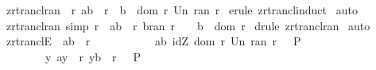 \begin{isabellebody}
\isamarkupfalse%
%
\endisatagproof
{\isafoldproof}%
%
\isadelimproof
\isanewline
%
\endisadelimproof
\isanewline
{}\isamarkupfalse%
\ zrtrancl{\isacharunderscore}ran{}\ {\isacharcolon}\ {\isachardoublequoteopen}{\isacharbang}{\isacharbang}r\ {\isachardot}{\isacharparenleft}a{\isacharcomma}b{\isacharparenright}\ {\isacharcolon}\ {\isacharparenleft}r{\isacharpercent}{\isacharasterisk}{\isacharparenright}\ {\isacharequal}{\isacharequal}{\isachargreater}\ b\ {\isacharcolon}\ dom\ r\ Un\ ran\ r{\isachardoublequoteclose}\isanewline
%
\isadelimproof
%
\endisadelimproof
%
\isatagproof
{}\isamarkupfalse%
\ {\isacharparenleft}erule\ zrtrancl{\isacharunderscore}induct{\isacharparenright}\isanewline
{}\isamarkupfalse%
\ auto\isanewline
{}\isamarkupfalse%
%
\endisatagproof
{\isafoldproof}%
%
\isadelimproof
\isanewline
%
\endisadelimproof
\isanewline
{}\isamarkupfalse%
\ zrtrancl{\isacharunderscore}ran{}\ {\isacharbrackleft}simp{\isacharbrackright}{\isacharcolon}\ {\isachardoublequoteopen}{\isacharbang}{\isacharbang}r\ {\isachardot}{\isacharbrackleft}{\isacharbar}\ {\isacharparenleft}a{\isacharcomma}b{\isacharparenright}\ {\isacharcolon}\ {\isacharparenleft}r{\isacharpercent}{\isacharasterisk}{\isacharparenright}{\isacharsemicolon}\ b{\isachartilde}{\isacharcolon}ran\ r\ {\isacharbar}{\isacharbrackright}\ \ {\isacharequal}{\isacharequal}{\isachargreater}\ b\ {\isacharcolon}\ dom\ r{\isachardoublequoteclose}\isanewline
%
\isadelimproof
%
\endisadelimproof
%
\isatagproof
{}\isamarkupfalse%
\ {\isacharparenleft}drule\ zrtrancl{\isacharunderscore}ran{}{\isacharparenright}\isanewline
{}\isamarkupfalse%
\ auto\isanewline
{}\isamarkupfalse%
%
\endisatagproof
{\isafoldproof}%
%
\isadelimproof
\isanewline
%
\endisadelimproof
\isanewline
\isanewline
\isanewline
{}\isamarkupfalse%
\ zrtranclE{}{\isacharcolon}\ {\isachardoublequoteopen}{\isacharbrackleft}{\isacharbar}\ {\isacharparenleft}a{\isacharcomma}b{\isacharparenright}\ {\isacharcolon}\ r{\isacharpercent}{\isacharasterisk}{\isacharsemicolon}\ \ \isanewline
\ \ \ \ \ \ \ \ {\isacharbrackleft}{\isacharbar}\ {\isacharparenleft}a{\isacharcomma}b{\isacharparenright}{\isacharcolon}\ {\isacharparenleft}idZ\ {\isacharparenleft}dom\ r\ Un\ ran\ r{\isacharparenright}{\isacharparenright}{\isacharbar}{\isacharbrackright}\ \ {\isacharequal}{\isacharequal}{\isachargreater}\ P{\isacharsemicolon}\ \ \ \ \ \ \ \ \ \isanewline
\ \ \ \ \ \ \ \ {\isacharbang}{\isacharbang}y{\isachardot}{\isacharbrackleft}{\isacharbar}\ {\isacharparenleft}a{\isacharcomma}y{\isacharparenright}\ {\isacharcolon}\ r{\isacharpercent}{\isacharasterisk}{\isacharsemicolon}\ {\isacharparenleft}y{\isacharcomma}b{\isacharparenright}\ {\isacharcolon}\ r\ {\isacharbar}{\isacharbrackright}\ {\isacharequal}{\isacharequal}{\isachargreater}\ P\ \ \ \isanewline

\end{isabellebody}
